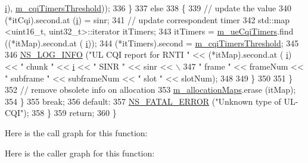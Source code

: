 \begin{DoxyCode}
      \hyperlink{bernuolliDistribution_8m_a6f6ccfcf58b31cb6412107d9d5281426}{i}), \hyperlink{classns3_1_1MmWaveRrMacScheduler_a21360d09f2e5e4b9fc304752aef8ae6a}{m\_cqiTimersThreshold}));
336               \}
337             \textcolor{keywordflow}{else}
338               \{
339                 \textcolor{comment}{// update the value}
340                 (*itCqi).second.at (\hyperlink{bernuolliDistribution_8m_a6f6ccfcf58b31cb6412107d9d5281426}{i}) = sinr;
341                 \textcolor{comment}{// update correspondent timer}
342                 std::map <uint16\_t, uint32\_t>::iterator itTimers;
343                 itTimers = \hyperlink{classns3_1_1MmWaveRrMacScheduler_a48957bee7e937b6d8627194fa429a473}{m\_ueCqiTimers}.find ((*itMap).second.at (
      \hyperlink{bernuolliDistribution_8m_a6f6ccfcf58b31cb6412107d9d5281426}{i}));
344                 (*itTimers).second = \hyperlink{classns3_1_1MmWaveRrMacScheduler_a21360d09f2e5e4b9fc304752aef8ae6a}{m\_cqiTimersThreshold};
345 
346                 \hyperlink{group__logging_gafbd73ee2cf9f26b319f49086d8e860fb}{NS\_LOG\_INFO} (\textcolor{stringliteral}{"UL CQI report for RNTI "} << (*itMap).second.at (
      \hyperlink{bernuolliDistribution_8m_a6f6ccfcf58b31cb6412107d9d5281426}{i}) << \textcolor{stringliteral}{" chunk "} << \hyperlink{bernuolliDistribution_8m_a6f6ccfcf58b31cb6412107d9d5281426}{i} << \textcolor{stringliteral}{" SINR "} << sinr << \(\backslash\)
347                                                       \textcolor{stringliteral}{" frame "} << frameNum << \textcolor{stringliteral}{" subframe "} << subframeNum 
      << \textcolor{stringliteral}{" slot "} << slotNum);
348 
349               \}
350 
351           \}
352         \textcolor{comment}{// remove obsolete info on allocation}
353         \hyperlink{classns3_1_1MmWaveRrMacScheduler_aac1f8a8418e80a70a78e8fb710697588}{m\_allocationMaps}.erase (itMap);
354       \}
355       \textcolor{keywordflow}{break};
356     \textcolor{keywordflow}{default}:
357       \hyperlink{group__fatal_ga5131d5e3f75d7d4cbfd706ac456fdc85}{NS\_FATAL\_ERROR} (\textcolor{stringliteral}{"Unknown type of UL-CQI"});
358     \}
359   \textcolor{keywordflow}{return};
360 \}
\end{DoxyCode}


Here is the call graph for this function\+:




Here is the caller graph for this function\+:


